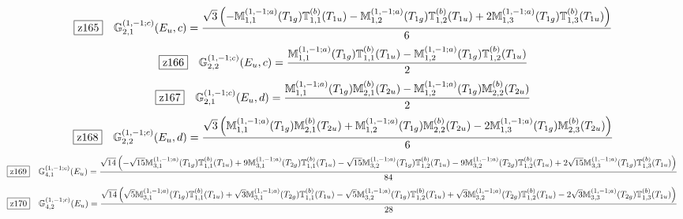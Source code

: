 \documentclass[fleqn,10pt,landscape]{jsarticle}
\begin{document}
\begin{dmath*}
\hspace*{3mm}\fbox{z165}\quad \mathbb{G}_{2,1}^{(1,-1;c)}(E_{u},c)=\frac{\sqrt{3} \left(- \mathbb{M}_{1,1}^{(1,-1;a)}(T_{1g}) \mathbb{T}_{1,1}^{(b)}(T_{1u}) - \mathbb{M}_{1,2}^{(1,-1;a)}(T_{1g}) \mathbb{T}_{1,2}^{(b)}(T_{1u}) + 2 \mathbb{M}_{1,3}^{(1,-1;a)}(T_{1g}) \mathbb{T}_{1,3}^{(b)}(T_{1u})\right)}{6}
\end{dmath*}
\begin{dmath*}
\hspace*{3mm}\fbox{z166}\quad \mathbb{G}_{2,2}^{(1,-1;c)}(E_{u},c)=\frac{\mathbb{M}_{1,1}^{(1,-1;a)}(T_{1g}) \mathbb{T}_{1,1}^{(b)}(T_{1u}) - \mathbb{M}_{1,2}^{(1,-1;a)}(T_{1g}) \mathbb{T}_{1,2}^{(b)}(T_{1u})}{2}
\end{dmath*}
\begin{dmath*}
\hspace*{3mm}\fbox{z167}\quad \mathbb{G}_{2,1}^{(1,-1;c)}(E_{u},d)=\frac{\mathbb{M}_{1,1}^{(1,-1;a)}(T_{1g}) \mathbb{M}_{2,1}^{(b)}(T_{2u}) - \mathbb{M}_{1,2}^{(1,-1;a)}(T_{1g}) \mathbb{M}_{2,2}^{(b)}(T_{2u})}{2}
\end{dmath*}
\begin{dmath*}
\hspace*{3mm}\fbox{z168}\quad \mathbb{G}_{2,2}^{(1,-1;c)}(E_{u},d)=\frac{\sqrt{3} \left(\mathbb{M}_{1,1}^{(1,-1;a)}(T_{1g}) \mathbb{M}_{2,1}^{(b)}(T_{2u}) + \mathbb{M}_{1,2}^{(1,-1;a)}(T_{1g}) \mathbb{M}_{2,2}^{(b)}(T_{2u}) - 2 \mathbb{M}_{1,3}^{(1,-1;a)}(T_{1g}) \mathbb{M}_{2,3}^{(b)}(T_{2u})\right)}{6}
\end{dmath*}
\begin{dmath*}
\hspace*{3mm}\fbox{z169}\quad \mathbb{G}_{4,1}^{(1,-1;c)}(E_{u})=\frac{\sqrt{14} \left(- \sqrt{15} \mathbb{M}_{3,1}^{(1,-1;a)}(T_{1g}) \mathbb{T}_{1,1}^{(b)}(T_{1u}) + 9 \mathbb{M}_{3,1}^{(1,-1;a)}(T_{2g}) \mathbb{T}_{1,1}^{(b)}(T_{1u}) - \sqrt{15} \mathbb{M}_{3,2}^{(1,-1;a)}(T_{1g}) \mathbb{T}_{1,2}^{(b)}(T_{1u}) - 9 \mathbb{M}_{3,2}^{(1,-1;a)}(T_{2g}) \mathbb{T}_{1,2}^{(b)}(T_{1u}) + 2 \sqrt{15} \mathbb{M}_{3,3}^{(1,-1;a)}(T_{1g}) \mathbb{T}_{1,3}^{(b)}(T_{1u})\right)}{84}
\end{dmath*}
\begin{dmath*}
\hspace*{3mm}\fbox{z170}\quad \mathbb{G}_{4,2}^{(1,-1;c)}(E_{u})=\frac{\sqrt{14} \left(\sqrt{5} \mathbb{M}_{3,1}^{(1,-1;a)}(T_{1g}) \mathbb{T}_{1,1}^{(b)}(T_{1u}) + \sqrt{3} \mathbb{M}_{3,1}^{(1,-1;a)}(T_{2g}) \mathbb{T}_{1,1}^{(b)}(T_{1u}) - \sqrt{5} \mathbb{M}_{3,2}^{(1,-1;a)}(T_{1g}) \mathbb{T}_{1,2}^{(b)}(T_{1u}) + \sqrt{3} \mathbb{M}_{3,2}^{(1,-1;a)}(T_{2g}) \mathbb{T}_{1,2}^{(b)}(T_{1u}) - 2 \sqrt{3} \mathbb{M}_{3,3}^{(1,-1;a)}(T_{2g}) \mathbb{T}_{1,3}^{(b)}(T_{1u})\right)}{28}
\end{dmath*}
\end{document}
